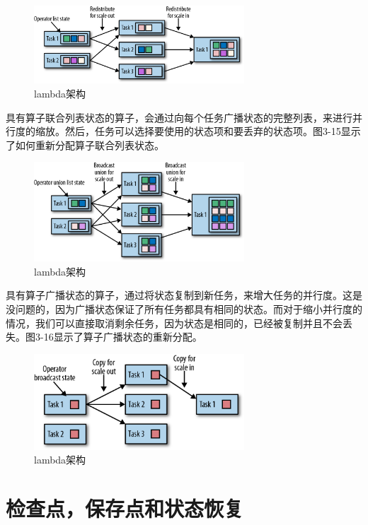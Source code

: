 \documentclass[cn,11pt,chinese]{elegantbook}
\begin{document}
\begin{figure}[htbp]
    \centering
    \includegraphics[width=0.7\textwidth]{images/spaf_0314.png}
    \caption{lambda架构}
\end{figure}

具有算子联合列表状态的算子，会通过向每个任务广播状态的完整列表，来进行并行度的缩放。然后，任务可以选择要使用的状态项和要丢弃的状态项。图3-15显示了如何重新分配算子联合列表状态。

\begin{figure}[htbp]
    \centering
    \includegraphics[width=0.7\textwidth]{images/spaf_0315.png}
    \caption{lambda架构}
\end{figure}

具有算子广播状态的算子，通过将状态复制到新任务，来增大任务的并行度。这是没问题的，因为广播状态保证了所有任务都具有相同的状态。而对于缩小并行度的情况，我们可以直接取消剩余任务，因为状态是相同的，已经被复制并且不会丢失。图3-16显示了算子广播状态的重新分配。

\begin{figure}[htbp]
    \centering
    \includegraphics[width=0.7\textwidth]{images/spaf_0316.png}
    \caption{lambda架构}
\end{figure}

\section{检查点，保存点和状态恢复}
\end{document}
